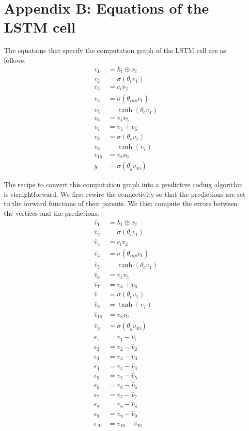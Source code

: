 \chapter{Appendix B: Equations of the LSTM cell}

The equations that specify the computation graph of the LSTM cell are as follows.
\begin{align*}
    v_1 &= h_t \oplus x_t \\
    v_2 &= \sigma(\theta_i v_1) \\ 
    v_3 &= c_t v_2 \\ 
    v_4 &= \sigma (\theta_{inp} v_1) \\ 
    v_5 &= \tanh(\theta_c v_1) \\ 
    v_6 &= v_4 v_5 \\ 
    v_7 &= v_3 + v_6 \\ 
    v_8 &= \sigma (\theta_o v_1)  \\ 
    v_9 &= \tanh(v_7)\\
    v_{10} &= v_8 v_9 \\
    y &= \sigma(\theta_y v_{10})
\end{align*}

The recipe to convert this computation graph into a predictive coding algorithm is straightforward. We first rewire the connectivity so that the predictions are set to the forward functions of their parents. We then compute the errors between the vertices and the predictions. 
\begin{align*}
    \hat{v}_1 &= h_t \oplus x_t \\
    \hat{v}_2 &= \sigma(\theta_i v_1) \\ 
    \hat{v}_3 &= c_t v_2 \\ 
    \hat{v}_4 &= \sigma (\theta_{inp} v_1) \\ 
    \hat{v}_5 &= \tanh(\theta_c v_1) \\ 
    \hat{v}_6 &= v_4 v_5 \\ 
    \hat{v}_7 &= v_3 + v_6 \\ 
    \hat{v} &= \sigma (\theta_o v_1)  \\ 
    \hat{v}_9 &= \tanh(v_7)\\
    \hat{v}_{10} &= v_8 v_9 \\
    \hat{v}_y &= \sigma(\theta_y v_{10}) \\
    \epsilon_1 &= v_1 - \hat{v}_1 \\
    \epsilon_2 &= v_2 - \hat{v}_2 \\
    \epsilon_3 &= v_3 - \hat{v}_3 \\
    \epsilon_4 &= v_4 - \hat{v}_4 \\
    \epsilon_5 &= v_5 - \hat{v}_5 \\
    \epsilon_6 &= v_6 - \hat{v}_6 \\
    \epsilon_7 &= v_7 - \hat{v}_7 \\
    \epsilon_8 &= v_8 - \hat{v}_8 \\
    \epsilon_9 &= v_9 - \hat{v}_9 \\
    \epsilon_{10} &= v_{10} - \hat{v}_{10}
\end{align*}
